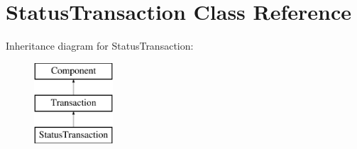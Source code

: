 \hypertarget{classStatusTransaction}{}\section{Status\+Transaction Class Reference}
\label{classStatusTransaction}
Inheritance diagram for Status\+Transaction\+:\begin{figure}[H]
\begin{center}
\leavevmode
\includegraphics[height=3.000000cm]{classStatusTransaction}
\end{center}
\end{figure}
